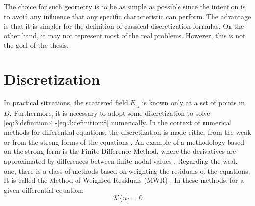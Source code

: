  		The choice for such geometry is to be as simple as possible since the intention is to avoid any influence that any specific characteristic can perform. The advantage is that it is simpler for the definition of classical discretization formulas. On the other hand, it may not represent most of the real problems. However, this is not the goal of the thesis.
 	
 	\section{Discretization}\label{chap:methods:discretization}
 	
 		In practical situations, the scattered field $E_{z_s}$ is known only at a set of points in $D$. Furthermore, it is necessary to adopt some discretization to solve \eqref{eq:3:definition:4}-\eqref{eq:3:definition:8} numerically. In the context of numerical methods for differential equations, the discretization is made either from the weak or from the strong forms of the equations \citep{liu2009meshfree}. An example of a methodology based on the strong form is the Finite Difference Method, where the derivatives are approximated by differences between finite nodal values \citep{yee1966numerical,taflove2005computational}. Regarding the weak one, there is a class of methods based on weighting the residuals of the equations. It is called the Method of Weighted Residuals (MWR) \citep{fletcher1984computational}. In these methods, for a given differential equation:
 		\begin{equation}
 			\mathcal{K}\{u\} = 0 \label{eq:3:discretization:0}
 		\end{equation}
 	
